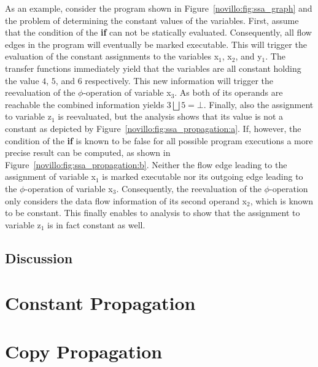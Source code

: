 As an example, consider the program shown in Figure~\ref{novillo:fig:ssa_graph}
and the problem of determining the constant values of the variables. First,
assume that the condition of the \textbf{if} can not be statically evaluated.
Consequently, all flow edges in the program will eventually be marked
executable. This will trigger the evaluation of the constant assignments to
the variables x$_1$,  x$_2$, and y$_1$. The transfer functions immediately yield
that the variables are all constant holding the value $4$, $5$, and $6$
respectively. This new information will trigger the reevaluation of the
$\phi$-operation of variable x$_3$. As both of its operands are reachable the
combined information yields $3 \bigsqcup 5 = \bot$. Finally, also the assignment
to variable z$_1$ is reevaluated, but the analysis shows that its value is not a
constant as depicted by Figure~\ref{novillo:fig:ssa_propagation:a}. If, however,
the condition of the \textbf{if} is known to be false for all possible program
executions a more precise result can be computed, as shown in
Figure~\ref{novillo:fig:ssa_propagation:b}. Neither the flow edge leading to the
assignment of variable x$_1$ is marked executable nor its outgoing edge leading
to the $\phi$-operation of variable x$_3$. Consequently, the reevaluation of
the $\phi$-operation only considers the data flow information of its second
operand x$_2$, which is known to be constant. This finally enables to analysis
to show that the assignment to variable z$_1$ is in fact constant as well.

\subsection{Discussion}



\section{Constant Propagation}
\label{novillo:sec:constant-prop}

\section{Copy Propagation}
\label{novillo:sec:copy-prop}

